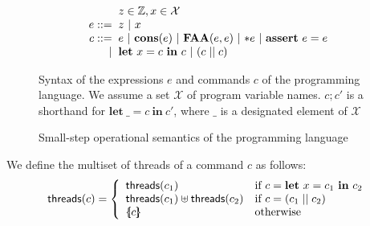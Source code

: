 \documentclass{article}
\newcommand{\llbrace}{\{\hspace{-3pt}[}
\newcommand{\rrbrace}{]\hspace{-3pt}\}}
\begin{document}
\begin{figure}
$$\begin{array}{r @{\;} @{\;} l}
& z \in \mathbb{Z}, x \in \mathcal{X}\\
e ::= & z\ |\ x\\
c ::= & e\ |\ \mathbf{cons}(e)\ |\ \mathbf{FAA}(e, e)\ |\ {*}e\ |\ \mathbf{assert}\ e = e\\
| & \mathbf{let}\ x = c\ \mathbf{in}\ c\ |\ (c\;||\;c)
\end{array}$$
\caption{Syntax of the expressions $e$ and commands $c$ of the programming language. We assume a set $\mathcal{X}$ of program variable names. $c; c'$ is a shorthand for $\mathbf{let}\ \_ = c\ \mathbf{in}\ c'$, where $\_$ is a designated element of $\mathcal{X}$}\label{fig:program-syntax}
\end{figure}

\begin{figure}
\caption{Small-step operational semantics of the programming language}\label{fig:program-steps}
\end{figure}

We define the multiset of threads of a command $c$ as follows:
$$\mathsf{threads}(c) = \left\{\begin{array}{l l}
\mathsf{threads}(c_1) & \textrm{if $c = \mathbf{let}\ x = c_1\ \mathbf{in}\ c_2$}\\
\mathsf{threads}(c_1) \uplus \mathsf{threads}(c_2) & \textrm{if $c = (c_1\;||\;c_2)$}\\
\llbrace c\rrbrace & \textrm{otherwise}
\end{array}\right.$$
\end{document}
